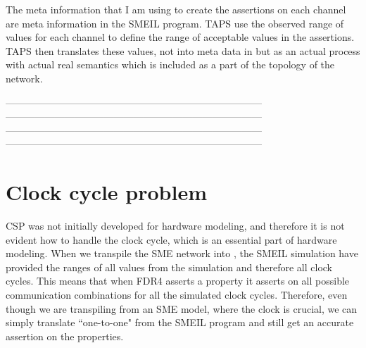 The meta information that I am using to create the assertions on each channel are meta information in the SMEIL program. TAPS use the observed range of values for each channel to define the range of acceptable values in the assertions. TAPS then translates these values, not into meta data in \cspm{} but as an actual process with actual real semantics which is included as a part of the topology of the \cspm{} network.


------------------------------------------------------------------------------\\
------------------------------------------------------------------------------\\
------------------------------------------------------------------------------\\
------------------------------------------------------------------------------\\



\section{Clock cycle problem}
% 

CSP was not initially developed for hardware modeling, and therefore it is not evident how to handle the clock cycle, which is an essential part of hardware modeling. When we transpile the SME network into \cspm{}, the SMEIL simulation have provided the ranges of all values from the simulation and therefore all clock cycles. This means that when FDR4 asserts a property it asserts on all possible communication combinations for all the simulated clock cycles. Therefore, even though we are transpiling from an SME model, where the clock is crucial, we can simply translate ``one-to-one" from the SMEIL program and still get an accurate assertion on the properties.










